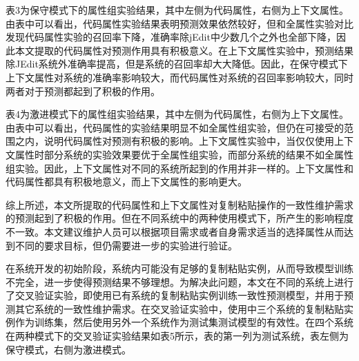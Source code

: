 表3为保守模式下的属性组实验结果，其中左侧为代码属性，右侧为上下文属性。由表中可以看出，代码属性实验结果表明预测效果依然较好，但和全属性实验对比发现代码属性实验的召回率下降，准确率除jEdit中少数几个之外也全部下降，因此本文提取的代码属性对预测作用具有积极意义。在上下文属性实验中，预测结果除JEdit系统外准确率提高，但是系统的召回率却大大降低。因此，在保守模式下上下文属性对系统的准确率影响较大，而代码属性对系统的召回率影响较大，同时两者对于预测都起到了积极的作用。

表4为激进模式下的属性组实验结果，其中左侧为代码属性，右侧为上下文属性。由表中可以看出，代码属性的实验结果明显不如全属性组实验，但仍在可接受的范围之内，说明代码属性对预测有积极的影响。上下文属性实验中，当仅仅使用上下文属性时部分系统的实验效果要优于全属性组实验，而部分系统的结果不如全属性组实验。因此，上下文属性对不同的系统所起到的作用并非一样的。上下文属性和代码属性都具有积极地意义，而上下文属性的影响更大。

综上所述，本文所提取的代码属性和上下文属性对复制粘贴操作的一致性维护需求的预测起到了积极的作用。但在不同系统中的两种使用模式下，所产生的影响程度不一致。本文建议维护人员可以根据项目需求或者自身需求适当的选择属性从而达到不同的要求目标，但仍需要进一步的实验进行验证。


在系统开发的初始阶段，系统内可能没有足够的复制粘贴实例，从而导致模型训练不完全，进一步使得预测结果不够理想。为解决此问题，本文在不同的系统上进行了交叉验证实验，即使用已有系统的复制粘贴实例训练一致性预测模型，并用于预测其它系统的一致性维护需求。在交叉验证实验中，使用中三个系统的复制粘贴实例作为训练集，然后使用另外一个系统作为测试集测试模型的有效性。在四个系统在两种模式下的交叉验证实验结果如表5所示，表的第一列为测试系统，表左侧为保守模式，右侧为激进模式。

